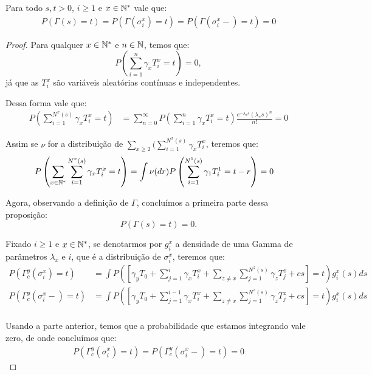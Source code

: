 \begin{proposicao}
  \label{prop:gamma-dist-continua}
  Para todo $s, t > 0$, $i \geq 1$ e $x \in {\mathbb{N^*}}$ vale que:
  \begin{align*}
    P(\Gamma(s) = t) = P(\Gamma(\sigma^x_i) = t) =
    P(\Gamma(\sigma^x_i-) = t) = 0
  \end{align*}
\end{proposicao}
\begin{proof}
  Para qualquer $x \in {\mathbb{N^*}}$ e $n \in {\mathbb{N}}$, temos que:
  \begin{displaymath}
    P\left(\sum_{i = 1}^n \gamma_x T_i^x = t\right) = 0,
  \end{displaymath}
  já que as $T_i^x$ são variáveis aleatórias contínuas e
  independentes.

  Dessa forma vale que:
  \begin{align*}
    P\left(\sum_{i = 1}^{N^x(s)} \gamma_x T_i^x = t\right) 
    &= \sum_{n = 0}^{\infty}
    P\left(\sum_{i = 1}^n \gamma_x T_i^x = t\right)
    \frac{e^{-\lambda_x s} (\lambda_x s)^n}{n!} = 0
  \end{align*}

  Assim se $\nu$ for a distribuição de $\sum_{x \geq 2} (\sum_{i =
    1}^{N^x(s)} \gamma_x T_i^x$, teremos que:
  \begin{align*}
    P\left(\sum_{x \in {\mathbb{N^*}}}\sum_{i = 1}^{N^x(s)} \gamma_x T_i^x = t\right) 
    &= \int \nu(dr) P\left(\sum_{i = 1}^{N^1(s)} \gamma_1 T_i^1 = t - r\right) 
    = 0
  \end{align*}

  Agora, observando a definição de $\Gamma$, concluímos a primeira
  parte dessa proposição:
  \begin{displaymath}
    P\left( \Gamma(s) = t \right) = 0.
  \end{displaymath}


  Fixado $i \geq 1$ e $x \in {\mathbb{N^*}}$, se denotarmos por $g^x_i$ a
  densidade de uma Gamma de parâmetros $\lambda_x$ e $i$, que é a
  distribuição de $\sigma^x_i$, teremos que:
  \begin{align*}
    P \left( \Gamma^y_c(\sigma^x_i) = t \right) &=
    \int P\left( \left[ \gamma_y T_0 + \sum_{j = 1}^{i} \gamma_x
    T_i^x + \sum_{z \neq x} \sum_{j = 1}^{N^z(s)} \gamma_z
    T^z_j + c s\right]  = t \right)g^x_i(s) ds\\
    P \left( \Gamma^y_c(\sigma^x_i-) = t \right) &=
    \int P\left( \left[ \gamma_y T_0 + \sum_{j = 1}^{i-1} \gamma_x
    T_i^x + \sum_{z \neq x} \sum_{j = 1}^{N^z(s)} \gamma_z
    T^z_j + c s\right]  = t \right)g^x_i(s) ds\\
  \end{align*}

  Usando a parte anterior, temos que a probabilidade que estamos
  integrando vale zero, de onde concluímos que:
 \begin{align*}
    P \left( \Gamma^y_c(\sigma^x_i) = t \right) =
    P \left( \Gamma^y_c(\sigma^x_i-) = t \right) =
    0
  \end{align*}
\end{proof}


